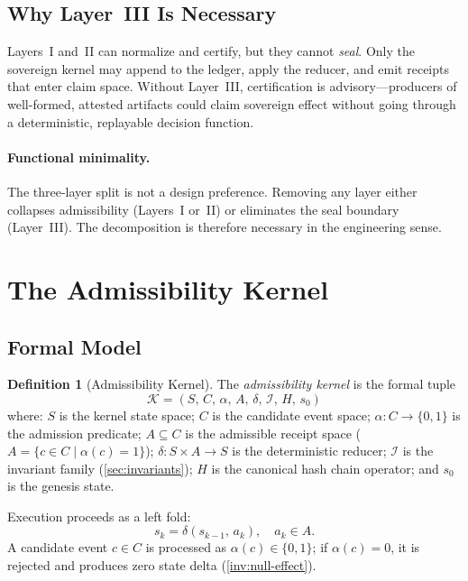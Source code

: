 \documentclass[11pt,a4paper]{article}
\theoremstyle{plain}
\theoremstyle{definition}
\newtheorem{definition}[theorem]{Definition}
\theoremstyle{remark}
\newcommand{\kernel}{\mathcal{K}}
\newcommand{\Inv}{\mathcal{I}}
\begin{document}
\subsection{Why Layer~III Is Necessary}
\label{sec:l3}

Layers~I and~II can normalize and certify, but they cannot \emph{seal}.
Only the sovereign kernel may append to the ledger, apply the reducer, and
emit receipts that enter claim space.
Without Layer~III, certification is advisory---producers of well-formed,
attested artifacts could claim sovereign effect without going through
a deterministic, replayable decision function.

\paragraph{Functional minimality.}
The three-layer split is not a design preference.
Removing any layer either collapses admissibility
(Layers~I or~II) or eliminates the seal boundary (Layer~III).
The decomposition is therefore necessary in the engineering sense.

\section{The Admissibility Kernel}
\label{sec:kernel}

\subsection{Formal Model}
\label{sec:kernel-formal}

\begin{definition}[Admissibility Kernel]
\label{def:kernel}
The \emph{admissibility kernel} is the formal tuple
\[
  \kernel = (S,\, C,\, \alpha,\, A,\, \delta,\, \Inv,\, H,\, s_0)
\]
where:
$S$ is the kernel state space;
$C$ is the candidate event space;
$\alpha : C \to \{0,1\}$ is the admission predicate;
$A \subseteq C$ is the admissible receipt space
($A = \{c \in C \mid \alpha(c) = 1\}$);
$\delta : S \times A \to S$ is the deterministic reducer;
$\Inv$ is the invariant family (\cref{sec:invariants});
$H$ is the canonical hash chain operator; and
$s_0$ is the genesis state.
\end{definition}

Execution proceeds as a left fold:
\[
  s_k = \delta(s_{k-1},\, a_k), \quad a_k \in A.
\]
A candidate event $c \in C$ is processed as $\alpha(c) \in \{0,1\}$;
if $\alpha(c) = 0$, it is rejected and produces zero state delta
(\cref{inv:null-effect}).
\end{document}
